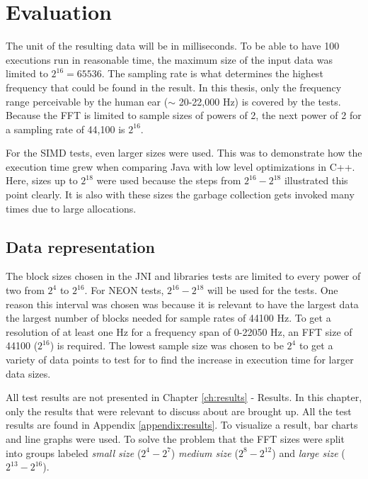 \section{Evaluation}
The unit of the resulting data will be in milliseconds. To be able to have 100 executions run in reasonable time, the maximum size of the input data was limited to $2^{16} = 65536$. The sampling rate is what determines the highest frequency that could be found in the result. In this thesis, only the frequency range perceivable by the human ear ($\sim$ 20-22,000 Hz) is covered by the tests. Because the FFT is limited to sample sizes of powers of 2, the next power of 2 for a sampling rate of 44,100 is $2^{16}$.

For the SIMD tests, even larger sizes were used. This was to demonstrate how the execution time grew when comparing Java with low level optimizations in C++. Here, sizes up to $2^{18}$ were used because the steps from $2^{16} - 2^{18}$ illustrated this point clearly. It is also with these sizes the garbage collection gets invoked many times due to large allocations.

\subsection{Data representation}
The block sizes chosen in the JNI and libraries tests are limited to every power of two from $2^4$ to $2^{16}$. For NEON tests, $2^{16} - 2^{18}$ will be used for the tests. One reason this interval was chosen was because it is relevant to have the largest data the largest number of blocks needed for sample rates of 44100 Hz. To get a resolution of at least one Hz for a frequency span of 0-22050 Hz, an FFT size of 44100 ($2^{16}$) is required. The lowest sample size was chosen to be $2^{4}$ to get a variety of data points to test for to find the increase in execution time for larger data sizes.

All test results are not presented in Chapter \ref{ch:results} - Results. In this chapter, only the results that were relevant to discuss about are brought up. All the test results are found in Appendix \ref{appendix:results}. To visualize a result, bar charts and line graphs were used. To solve the problem that the FFT sizes were split into groups labeled \emph{small size} ($2^{4} - 2^{7}$) \emph{medium size} ($2^{8} - 2^{12}$) and \emph{large size} ($2^{13} - 2^{16}$).

